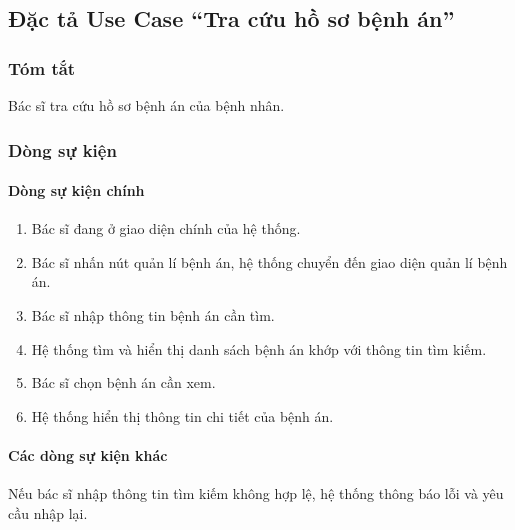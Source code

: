 \subsection{Đặc tả Use Case ``Tra cứu hồ sơ bệnh án''}

\subsubsection{Tóm tắt}
Bác sĩ tra cứu hồ sơ bệnh án của bệnh nhân.

\subsubsection{Dòng sự kiện}
\paragraph{\textbf{Dòng sự kiện chính}}
\begin{enumerate}
    \item Bác sĩ đang ở giao diện chính của hệ thống.
    \item Bác sĩ nhấn nút quản lí bệnh án, hệ thống chuyển đến giao diện quản lí bệnh án.
    \item Bác sĩ nhập thông tin bệnh án cần tìm.
    \item Hệ thống tìm và hiển thị danh sách bệnh án khớp với thông tin tìm kiếm.
    \item Bác sĩ chọn bệnh án cần xem.
    \item Hệ thống hiển thị thông tin chi tiết của bệnh án.
\end{enumerate}

\paragraph{\textbf{Các dòng sự kiện khác}}
Nếu bác sĩ nhập thông tin tìm kiếm không hợp lệ, hệ thống thông báo lỗi và yêu cầu nhập lại.

